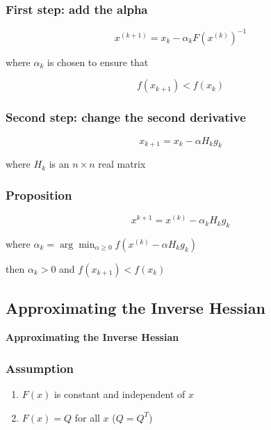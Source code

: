 
\begin{frame}
	\frametitle{First step: add the alpha}
	$$x^{(k+1)} = x_k - \alpha_k F(x^{(k)})^{-1}$$
	
	where $\alpha_k$ is chosen to ensure that
	
	$$f(x_{k+1}) < f(x_k)$$
\end{frame}


\begin{frame}
	\frametitle{Second step: change the second derivative}
	
	$$x_{k+1} = x_k - \alpha H_kg_k$$
	
	where $H_k$ is an $n \times n$ real matrix
\end{frame}


\begin{frame}
	\frametitle{Proposition}
	
	$$x^{k+1} = x^{(k)} - \alpha_kH_kg_k$$
	
	where $\alpha_k = \arg\min_{\alpha \geq 0} f(x^{(k)}  - \alpha H_kg_k)$
	
	then $\alpha_k > 0$ and $f(x_{k+1}) < f(x_k)$
\end{frame}


\begin{frame}
	\section{Approximating the Inverse Hessian}
	\begin{center}
	\begin{Huge}
	\textbf{Approximating the Inverse Hessian}
	\end{Huge}
	\end{center}
\end{frame}


\begin{frame}
	\frametitle{Assumption}
	
	\begin{enumerate}
	\item $F(x)$ is constant and independent of $x$
	\item $F(x) = Q$ for all $x$ ($Q = Q^T$)
	\end{enumerate}
\end{frame}

